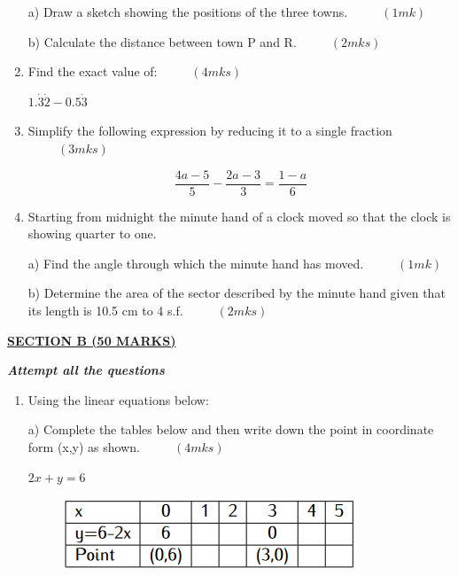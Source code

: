 \documentclass[
  a4paperpaper,
]{scrbook}
\begin{document}
\begin{tcolorbox}
\begin{enumerate}
  a) Draw a sketch showing the positions of the three towns.
  \(\hspace{1cm} (1mk)\)

  b) Calculate the distance between town P and R.
  \(\hspace{1cm} (2mks)\)
\item
  Find the exact value of: \(\hspace{1cm}(4mks)\)

  \(1.\dot{3}\dot{2}-0.5\dot{3}\)
\item
  Simplify the following expression by reducing it to a single fraction
  \(\hspace{1cm}(3mks)\)

  \[\frac{4a-5}{5}-\frac{2a-3}{3}=\frac{1-a}{6}\]
\item
  Starting from midnight the minute hand of a clock moved so that the
  clock is showing quarter to one.

  a) Find the angle through which the minute hand has moved.
  \(\hspace{1cm} (1mk)\)

  b) Determine the area of the sector described by the minute hand given
  that its length is 10.5 cm to 4 s.f. \(\hspace{1cm} (2mks)\)
\end{enumerate}

\ul{\textbf{SECTION B (50 MARKS)}}

\textbf{\emph{Attempt all the questions}}

\begin{enumerate}
\def\labelenumi{\arabic{enumi}.}
\setcounter{enumi}{16}
\item
  Using the linear equations below:

  a) Complete the tables below and then write down the point in
  coordinate form (x,y) as shown. \(\hspace{1cm} (4mks)\)

  \(2x+y=6\)

  \begin{figure}

  \includegraphics{figures/Md5_Q17a.png} \hfill{}

  \end{figure}


\end{enumerate}
\end{tcolorbox}
\end{document}
